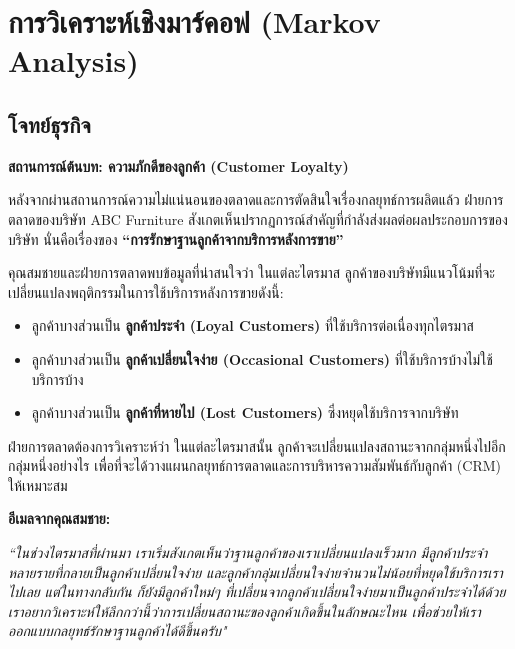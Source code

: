 \chapter{การวิเคราะห์เชิงมาร์คอฟ (Markov Analysis)}

\section*{โจทย์ธุรกิจ}
\textbf{สถานการณ์ต้นบท: ความภักดีของลูกค้า (Customer Loyalty)}

หลังจากผ่านสถานการณ์ความไม่แน่นอนของตลาดและการตัดสินใจเรื่องกลยุทธ์การผลิตแล้ว  
ฝ่ายการตลาดของบริษัท ABC Furniture สังเกตเห็นปรากฏการณ์สำคัญที่กำลังส่งผลต่อผลประกอบการของบริษัท นั่นคือเรื่องของ \textbf{“การรักษาฐานลูกค้าจากบริการหลังการขาย”}

คุณสมชายและฝ่ายการตลาดพบข้อมูลที่น่าสนใจว่า ในแต่ละไตรมาส ลูกค้าของบริษัทมีแนวโน้มที่จะเปลี่ยนแปลงพฤติกรรมในการใช้บริการหลังการขายดังนี้:

\begin{itemize}
    \item ลูกค้าบางส่วนเป็น \textbf{ลูกค้าประจำ (Loyal Customers)} ที่ใช้บริการต่อเนื่องทุกไตรมาส
    \item ลูกค้าบางส่วนเป็น \textbf{ลูกค้าเปลี่ยนใจง่าย (Occasional Customers)} ที่ใช้บริการบ้างไม่ใช้บริการบ้าง
    \item ลูกค้าบางส่วนเป็น \textbf{ลูกค้าที่หายไป (Lost Customers)} ซึ่งหยุดใช้บริการจากบริษัท
\end{itemize}

ฝ่ายการตลาดต้องการวิเคราะห์ว่า ในแต่ละไตรมาสนั้น ลูกค้าจะเปลี่ยนแปลงสถานะจากกลุ่มหนึ่งไปอีกกลุ่มหนึ่งอย่างไร  
เพื่อที่จะได้วางแผนกลยุทธ์การตลาดและการบริหารความสัมพันธ์กับลูกค้า (CRM) ให้เหมาะสม

\vspace{0.5em}
\noindent
\textbf{อีเมลจากคุณสมชาย:}
\begin{tcolorbox}[colback=white!100!white, colframe=black!80!white,
  title=ข้อความ,
  fonttitle=\bfseries,
  sharp corners=southwest,
  boxrule=0.8pt,
  left=1mm, right=1mm, top=1mm, bottom=1mm,
]
\emph{
``ในช่วงไตรมาสที่ผ่านมา เราเริ่มสังเกตเห็นว่าฐานลูกค้าของเราเปลี่ยนแปลงเร็วมาก  
มีลูกค้าประจำหลายรายที่กลายเป็นลูกค้าเปลี่ยนใจง่าย  
และลูกค้ากลุ่มเปลี่ยนใจง่ายจำนวนไม่น้อยที่หยุดใช้บริการเราไปเลย  
แต่ในทางกลับกัน ก็ยังมีลูกค้าใหม่ๆ ที่เปลี่ยนจากลูกค้าเปลี่ยนใจง่ายมาเป็นลูกค้าประจำได้ด้วย  
เราอยากวิเคราะห์ให้ลึกกว่านี้ว่าการเปลี่ยนสถานะของลูกค้าเกิดขึ้นในลักษณะไหน  
เพื่อช่วยให้เราออกแบบกลยุทธ์รักษาฐานลูกค้าได้ดีขึ้นครับ"}
\end{tcolorbox}

